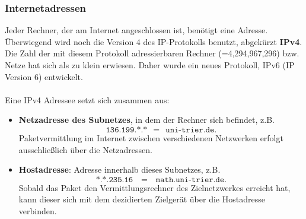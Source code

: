 \subsubsection{Internetadressen}
Jeder Rechner, der am Internet angeschlossen ist, benötigt eine Adresse. Überwiegend wird noch die Version 4 des IP-Protokolls benutzt, abgekürzt \textbf{IPv4}. Die Zahl der mit diesem Protokoll adressierbaren Rechner (=4,294,967,296) bzw. Netze hat sich als zu klein erwiesen. Daher wurde ein neues Protokoll, IPv6 (IP Version 6) entwickelt.
~\\~\\
Eine IPv4 Adressee setzt sich zusammen aus:

\begin{itemize}
	\item \textbf{Netzadresse des Subnetzes}, in dem der Rechner sich	befindet, z.B. $$\texttt{136.199.*.*} ~~= ~~\texttt{uni-trier.de}.$$
	Paketvermittlung im Internet zwischen verschiedenen Netzwerken erfolgt ausschließlich über die Netzadressen.
	\item \textbf{Hostadresse}: Adresse innerhalb dieses Subnetzes, z.B. $$\texttt{*.*.235.16 ~~=~~ math.uni-trier.de}.$$
	Sobald das Paket den Vermittlungsrechner des Zielnetzwerkes erreicht hat, kann dieser sich mit dem dezidierten Zielgerät über die Hostadresse verbinden.\\~\\
\end{itemize}

